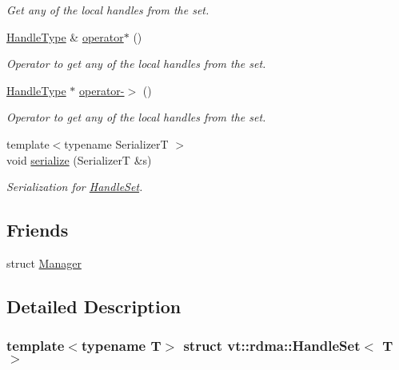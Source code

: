 \begin{DoxyCompactItemize}
\begin{DoxyCompactList}\small\item\em Get any of the local handles from the set. \end{DoxyCompactList}\item 
\hyperlink{structvt_1_1rdma_1_1_handle_set_ab3a698ee86bae503dfa84617205b2dd9}{Handle\+Type} \& \hyperlink{structvt_1_1rdma_1_1_handle_set_a9ad10a3906540909c0344bbf84789fba}{operator$\ast$} ()
\begin{DoxyCompactList}\small\item\em Operator to get any of the local handles from the set. \end{DoxyCompactList}\item 
\hyperlink{structvt_1_1rdma_1_1_handle_set_ab3a698ee86bae503dfa84617205b2dd9}{Handle\+Type} $\ast$ \hyperlink{structvt_1_1rdma_1_1_handle_set_a0f19b37d4a11e43a1ab68710b9d15404}{operator-\/$>$} ()
\begin{DoxyCompactList}\small\item\em Operator to get any of the local handles from the set. \end{DoxyCompactList}\item 
{\footnotesize template$<$typename SerializerT $>$ }\\void \hyperlink{structvt_1_1rdma_1_1_handle_set_a4a78a0c0e54d6044676c560c00fba248}{serialize} (SerializerT \&s)
\begin{DoxyCompactList}\small\item\em Serialization for {\ttfamily \hyperlink{structvt_1_1rdma_1_1_handle_set}{Handle\+Set}}. \end{DoxyCompactList}\end{DoxyCompactItemize}
\subsection*{Friends}
\begin{DoxyCompactItemize}
\item 
struct \hyperlink{structvt_1_1rdma_1_1_handle_set_a1fd6b9bc3f72bb2b64e602de3982929d}{Manager}
\end{DoxyCompactItemize}


\subsection{Detailed Description}
\subsubsection*{template$<$typename T$>$\newline
struct vt\+::rdma\+::\+Handle\+Set$<$ T $>$}

